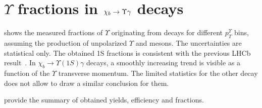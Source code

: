 \section[$\Upsilon$ fractions]{\texorpdfstring{$\Upsilon$}{Y} fractions in \texorpdfstring{$\chi_{{b}} \rightarrow \Upsilon \gamma$}{chib --> Y gamma} decays}
\label{sec:fraction}

 shows the measured fractions of $\Upsilon$  originating
from \chib decays for different $p_T^{\Upsilon}$ bins,  assuming the production
of unpolarized $\Upsilon$ and \chib mesons. The uncertainties are statistical
only. The obtained \Y1S fractions is consistent with the previous LHCb
result~\cite{LHCb-PAPER-2012-015}. In $\chi_b \rightarrow \Upsilon(1S) \gamma$
decays, a smoothly increasing trend is visible as a function of the $\Upsilon$
transverse momentum. The limited statistics for the other decay does not allow
to draw a similar conclusion for them.




 provide the summary
of obtained yields, efficiency and fractions.


